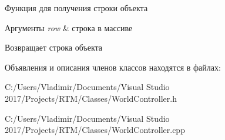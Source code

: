 Функция для получения строки объекта 
\begin{DoxyParams}{Аргументы}
{\em row} & строка в массиве \\
\hline
\end{DoxyParams}
\begin{DoxyReturn}{Возвращает}
строка объекта 
\end{DoxyReturn}


Объявления и описания членов классов находятся в файлах\+:\begin{DoxyCompactItemize}
\item 
C\+:/\+Users/\+Vladimir/\+Documents/\+Visual Studio 2017/\+Projects/\+R\+T\+M/\+Classes/World\+Controller.\+h\item 
C\+:/\+Users/\+Vladimir/\+Documents/\+Visual Studio 2017/\+Projects/\+R\+T\+M/\+Classes/World\+Controller.\+cpp\end{DoxyCompactItemize}
